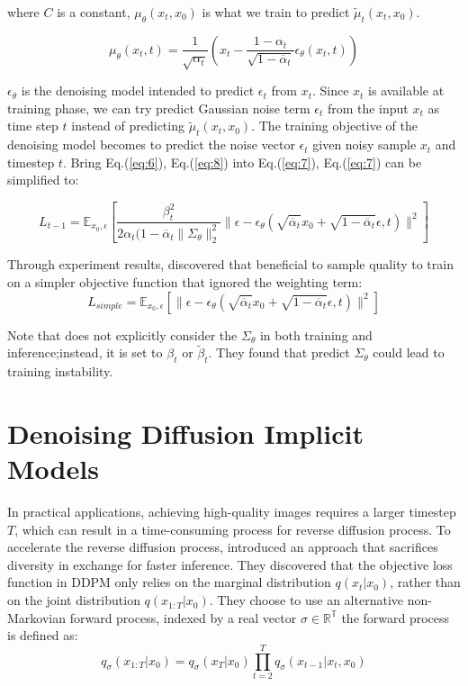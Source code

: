 where $C$ is a constant, $\mu_\theta(x_t, x_0)$ is what we train to predict $\tilde{\mu}_t(x_t, x_0)$. 

\begin{equation} \label{eq:8}
    \mu_\theta(x_t, t) = \frac{1}{\sqrt{\alpha_t}}(x_t - \frac{1 - \alpha_t}{\sqrt{1 - \overline{\alpha}_t}}\epsilon_\theta(x_t, t))
\end{equation}

$\epsilon_\theta$ is the denoising model intended to predict $\epsilon_t$ from $x_t$. Since $x_t$ is available at training phase, we can try predict Gaussian noise term $\epsilon_t$ from the input $x_t$ as time step $t$ instead of predicting $\tilde{\mu}_t(x_t, x_0)$. The training objective of the denoising model becomes to predict the noise vector $\epsilon_t$ given noisy sample $x_t$ and timestep $t$. Bring Eq.(\ref{eq:6}), Eq.(\ref{eq:8}) into Eq.(\ref{eq:7}), Eq.(\ref{eq:7}) can be simplified to:

\begin{equation} \label{eq:9}
    L_{t-1} = \mathbb{E}_{x_0, \epsilon}[\frac{\beta_t^2}{2\alpha_t(1 - \overline{\alpha}_t\|\Sigma_\theta\|_2^2}\|\epsilon - \epsilon_\theta(\sqrt{\overline{\alpha}_t}x_0 + \sqrt{1 - \overline{\alpha}_t}\epsilon, t)\|^2]
\end{equation}

Through experiment results, \cite{ho2020denoising} discovered that beneficial to sample quality to train on a simpler objective function that ignored the weighting term:
\begin{equation} \label{eq:10}
    L_{simple} = \mathbb{E}_{x_0, \epsilon}[\|\epsilon - \epsilon_\theta(\sqrt{\overline{\alpha}_t}x_0 + \sqrt{1 - \overline{\alpha}_t}\epsilon, t)\|^2]
\end{equation}


Note that \cite{ho2020denoising} does not explicitly consider the $\Sigma_\theta$ in both training and inference;instead, it is set to $\beta_t$ or $\tilde{\beta}_t$. They found that predict $\Sigma_\theta$ could lead to training instability.

\section{Denoising Diffusion Implicit Models}
In practical applications, achieving high-quality images requires a larger timestep $T$, which can result in a time-consuming process for reverse diffusion process. To accelerate the reverse diffusion process, \cite{song2020denoising} introduced an approach that sacrifices diversity in exchange for faster inference. They discovered that the objective loss function in DDPM only relies on the marginal distribution $q(x_t|x_0)$, rather than on the joint distribution $q(x_{1:T}|x_0)$. They choose to use an alternative non-Markovian forward process, indexed by a real vector $\sigma \in \mathbb{R^T}$ the forward process is defined as:
\begin{equation} \label{eq:11}
    q_\sigma(x_{1:T}|x_0) = q_\sigma(x_T|x_0)\prod_{t=2}^{T}q_\sigma(x_{t-1}|x_t, x_0)
\end{equation}

